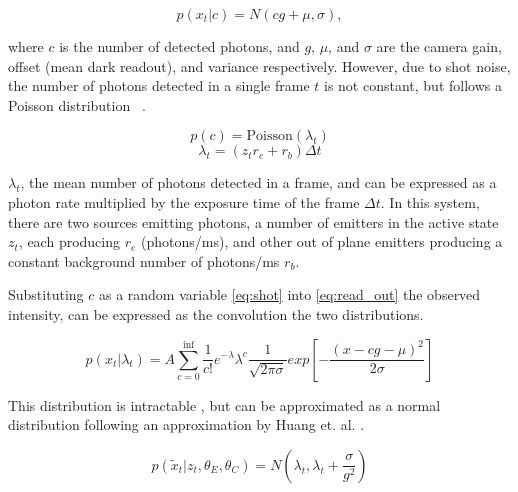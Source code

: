   \begin{equation}
    p(x_{t}|c) = N(cg + \mu, \sigma),
    \label{eq:read_out}
  \end{equation}

  where $c$ is the number of detected photons, and $g$, $\mu$, and $\sigma$ are the
  camera gain, offset (mean dark readout), and variance respectively.
  However, due to shot noise, the number of photons detected in a single frame $t$ is not constant, 
  but follows a Poisson distribution~\cite{mehta_poisson_2016} .

  \begin{equation}
    p(c) = \text{Poisson}(\lambda_{t})
    \label{eq:shot}
  \end{equation}
  \begin{equation*}
    \lambda_{t} = (z_{t}r_e + r_{b}) \Delta t
  \end{equation*}

  $\lambda_{t}$, the mean number of photons detected in a frame, and
    can be expressed as a photon rate multiplied by the exposure time of the frame $\Delta t$.
    In this system, there are two sources emitting photons, a number of emitters in the active state $z_t$, each producing $r_e$ (photons/ms), and 
    other out of plane emitters producing a constant background number of photons/ms $r_b$.

Substituting $c$ as a random variable \eqref{eq:shot} into \eqref{eq:read_out} 
  the observed intensity, can be expressed as the convolution the two distributions.

  \begin{equation*}
    p(x_{t}| \lambda_{t}) = A \sum_{c=0}^{\text{inf}}\frac{1}{c!} e^{-\lambda} \lambda^{c}
    \frac{1}{\sqrt{2\pi\sigma}}
    exp \left[ - \frac{(x - cg - \mu)^2}{2\sigma}\right]
  \end{equation*}

  This distribution is intractable , but can be approximated as a normal distribution 
  following an approximation by Huang et. al. \cite{huang_video-rate_2013}.

  \begin{equation}
    p(\tilde{x}_{t}| z_{t}, \theta_{E}, \theta_{C}) = N \left(\lambda_{t}, \lambda_{t} + \frac{\sigma}{g^{2}} \right)
    \label{eq:method:intensity_distribution}
  \end{equation}
  
